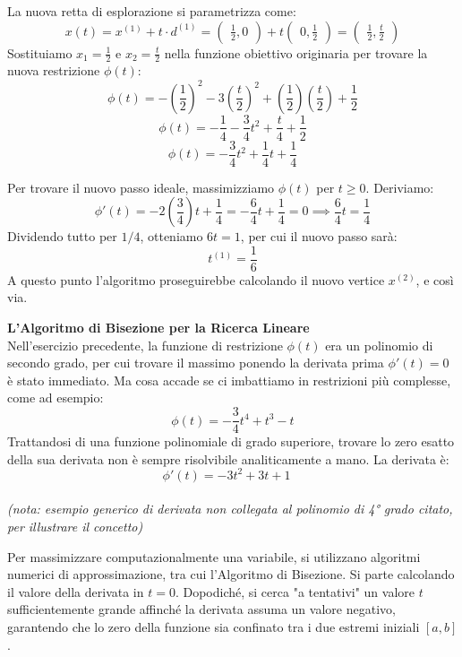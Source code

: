 \documentclass[12pt, a4paper]{article}
\newcommand{\separatore}{\noindent{\color{titlecolor!50}\rule{\textwidth}{0.6pt}}}
\begin{document}
	La nuova retta di esplorazione si parametrizza come:
	\[ x(t) = x^{(1)} + t \cdot d^{(1)} = \begin{pmatrix} \frac{1}{2}, 0 \end{pmatrix} + t \begin{pmatrix} 0, \frac{1}{2} \end{pmatrix} = \begin{pmatrix} \frac{1}{2}, \frac{t}{2} \end{pmatrix} \]
	Sostituiamo $x_1 = \frac{1}{2}$ e $x_2 = \frac{t}{2}$ nella funzione obiettivo originaria per trovare la nuova restrizione $\phi(t)$:
	\[ \phi(t) = -\left(\frac{1}{2}\right)^2 - 3\left(\frac{t}{2}\right)^2 + \left(\frac{1}{2}\right)\left(\frac{t}{2}\right) + \frac{1}{2} \]
	\[ \phi(t) = -\frac{1}{4} - \frac{3}{4}t^2 + \frac{t}{4} + \frac{1}{2} \]
	\[ \phi(t) = -\frac{3}{4}t^2 + \frac{1}{4}t + \frac{1}{4} \]
	
	Per trovare il nuovo passo ideale, massimizziamo $\phi(t)$ per $t \ge 0$. Deriviamo:
	\[ \phi'(t) = -2\left(\frac{3}{4}\right)t + \frac{1}{4} = -\frac{6}{4}t + \frac{1}{4} = 0 \implies \frac{6}{4}t = \frac{1}{4} \]
	Dividendo tutto per $1/4$, otteniamo $6t = 1$, per cui il nuovo passo sarà:
	\[ t^{(1)} = \frac{1}{6} \]
	A questo punto l'algoritmo proseguirebbe calcolando il nuovo vertice $x^{(2)}$, e così via.
	
	\vspace{0.6cm}
	\separatore
	\vspace{0.4cm}
	
	\textbf{L'Algoritmo di Bisezione per la Ricerca Lineare}\\
	Nell'esercizio precedente, la funzione di restrizione $\phi(t)$ era un polinomio di secondo grado, per cui trovare il massimo ponendo la derivata prima $\phi'(t) = 0$ è stato immediato. Ma cosa accade se ci imbattiamo in restrizioni più complesse, come ad esempio:
	\[ \phi(t) = -\frac{3}{4}t^4 + t^3 - t \]
	Trattandosi di una funzione polinomiale di grado superiore, trovare lo zero esatto della sua derivata non è sempre risolvibile analiticamente a mano.
	La derivata è:
	\[ \phi'(t) = -3t^2 + 3t + 1 \quad\]\\ \textit{(nota: esempio generico di derivata non collegata al polinomio di 4° grado citato, per illustrare il concetto)}
	
	Per massimizzare computazionalmente una variabile, si utilizzano algoritmi numerici di approssimazione, tra cui l'Algoritmo di Bisezione.
	Si parte calcolando il valore della derivata in $t=0$. Dopodiché, si cerca "a tentativi" un valore $t$ sufficientemente grande affinché la derivata assuma un valore negativo, garantendo che lo zero della funzione sia confinato tra i due estremi iniziali $[a, b]$. 
	
\end{document}
